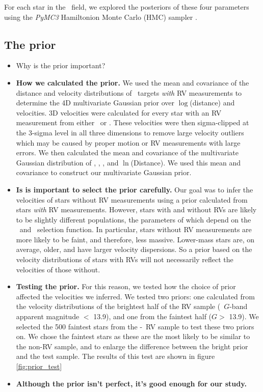 For each star in the \kepler\ field, we explored the posteriors of these four
parameters using the {\it PyMC3} Hamiltonion Monte Carlo (HMC) sampler
.

\subsection{The prior}
\label{sec:prior}

\begin{itemize}
    \item{Why is the prior important?}
    \item{{\bf How we calculated the prior.}
We used the mean and covariance of the distance and velocity distributions of
\kepler\ targets {\it with} RV measurements to determine the 4D multivariate
Gaussian prior over $\log$(distance) and velocities.
3D velocities were calculated for every star with an RV measurement from
either \gaia\ or \lamost.
These velocities were then sigma-clipped at the 3-sigma level in all three
dimensions to remove large velocity outliers which may be caused by proper
motion or RV measurements with large errors.
We then calculated the mean and covariance of the multivariate Gaussian
distribution of \vx, \vy, \vz, and $\ln$(Distance).
We used this mean and covariance to construct our multivariate Gaussian prior.
        }
    \item{{\bf Is is important to select the prior carefully.}
Our goal was to infer the velocities of stars without RV measurements using a
prior calculated from stars {\it with} RV measurements.
However, stars with and without RVs are likely to be slightly different
populations, the parameters of which depend on the \gaia\ and \lamost\
selection function.
In particular, stars without RV measurements are more likely to be faint, and
therefore, less massive.
Lower-mass stars are, on average, older, and have larger velocity dispersions.
So a prior based on the velocity distributions of stars with RVs will not
necessarily reflect the velocities of those without.
        }
    \item{{\bf Testing the prior.}
For this reason, we tested how the choice of prior affected the velocities we
inferred.
We tested two priors: one calculated from the velocity distributions of the
brightest half of the RV sample (\gaia\ $G$-band apparent magnitude $<$ 13.9),
and one from the faintest half ($G > $ 13.9).
We selected the 500 faintest stars from the \gaia-\lamost\ RV sample to test
these two priors on.
We chose the faintest stars as these are the most likely to be similar to the
non-RV sample, and to enlarge the difference between the bright prior and the
test sample.
The results of this test are shown in figure \ref{fig:prior_test}
        }
    \item{{\bf Although the prior isn't perfect, it's good
        enough for our study.}}
\end{itemize}


